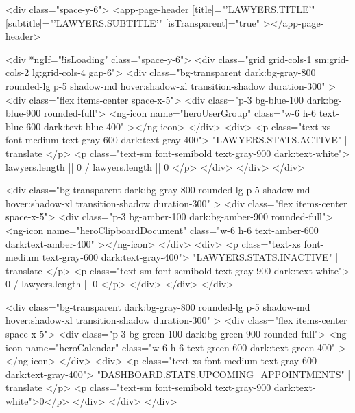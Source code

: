 <div class="space-y-6">
  <app-page-header
    [title]="'LAWYERS.TITLE'"
    [subtitle]="'LAWYERS.SUBTITLE'"
    [isTransparent]="true"
  ></app-page-header>

  <div *ngIf="!isLoading" class="space-y-6">
    <div class="grid grid-cols-1 sm:grid-cols-2 lg:grid-cols-4 gap-6">
      <div
        class="bg-transparent dark:bg-gray-800 rounded-lg p-5 shadow-md hover:shadow-xl transition-shadow duration-300"
      >
        <div class="flex items-center space-x-5">
          <div class="p-3 bg-blue-100 dark:bg-blue-900 rounded-full">
            <ng-icon
              name="heroUserGroup"
              class="w-6 h-6 text-blue-600 dark:text-blue-400"
            ></ng-icon>
          </div>
          <div>
            <p class="text-xs font-medium text-gray-600 dark:text-gray-400">
              {{ "LAWYERS.STATS.ACTIVE" | translate }}
            </p>
            <p class="text-sm font-semibold text-gray-900 dark:text-white">
              {{ lawyers.length || 0 }} / {{ lawyers.length || 0 }}
            </p>
          </div>
        </div>
      </div>

      <div
        class="bg-transparent dark:bg-gray-800 rounded-lg p-5 shadow-md hover:shadow-xl transition-shadow duration-300"
      >
        <div class="flex items-center space-x-5">
          <div class="p-3 bg-amber-100 dark:bg-amber-900 rounded-full">
            <ng-icon
              name="heroClipboardDocument"
              class="w-6 h-6 text-amber-600 dark:text-amber-400"
            ></ng-icon>
          </div>
          <div>
            <p class="text-xs font-medium text-gray-600 dark:text-gray-400">
              {{ "LAWYERS.STATS.INACTIVE" | translate }}
            </p>
            <p class="text-sm font-semibold text-gray-900 dark:text-white">
              0 / {{ lawyers.length || 0 }}
            </p>
          </div>
        </div>
      </div>

      <div
        class="bg-transparent dark:bg-gray-800 rounded-lg p-5 shadow-md hover:shadow-xl transition-shadow duration-300"
      >
        <div class="flex items-center space-x-5">
          <div class="p-3 bg-green-100 dark:bg-green-900 rounded-full">
            <ng-icon
              name="heroCalendar"
              class="w-6 h-6 text-green-600 dark:text-green-400"
            ></ng-icon>
          </div>
          <div>
            <p class="text-xs font-medium text-gray-600 dark:text-gray-400">
              {{ "DASHBOARD.STATS.UPCOMING_APPOINTMENTS" | translate }}
            </p>
            <p class="text-sm font-semibold text-gray-900 dark:text-white">0</p>
          </div>
        </div>
      </div>

